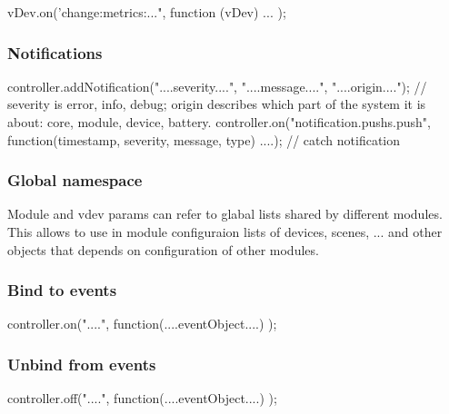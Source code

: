 vDev.on('change:metrics:...", function (vDev) { ... });


 
\subsubsection{Notifications}

controller.addNotification("....severity....", "....message....", "....origin...."); // severity is error, info, debug; origin describes which part of the system it is about: core, module, device, battery.
controller.on("notification.pushs.push", function({timestamp, severity, message, type}) {....}); // catch notification

\subsubsection{Global namespace}
Module and vdev params can refer to glabal lists shared by different modules. This allows 
to use in module configuraion lists of devices, scenes, ... and other objects that depends 
on configuration of other modules.

\subsubsection{Bind to events}

controller.on("....", function(....eventObject....) {});


\subsubsection{Unbind from events}

controller.off("....", function(....eventObject....) {});
